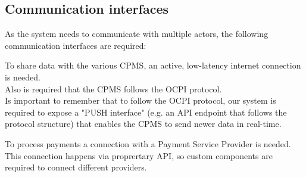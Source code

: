 \subsection{Communication interfaces}
As the system needs to communicate with multiple actors, the following communication interfaces are required:

\begin{enumerate}
	To share data with the various CPMS, an active, low-latency internet connection is needed.\\
   Also is required that the CPMS follows the OCPI protocol.\\
   Is important to remember that to follow the OCPI protocol, our system is required to expose a "PUSH interface" (e.g. an API endpoint that follows the protocol structure) that enables the CPMS to send newer data in real-time.
   
    To process payments a connection with a Payment Service Provider is needed. This connection happens via proprertary API, so custom components are required to connect different providers.
\end{enumerate}


























